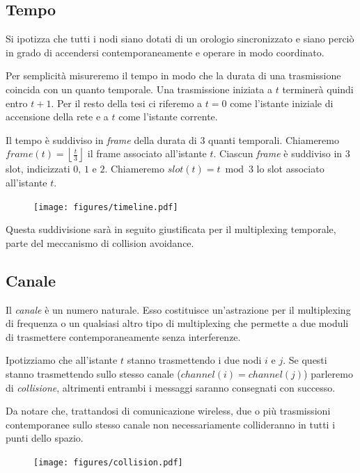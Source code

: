 \documentclass[a4paper,12pt]{article}
\theoremstyle{definition}
\begin{document}
\subsection{Tempo}

Si ipotizza che tutti i nodi siano dotati di un orologio sincronizzato e siano perciò in grado di accendersi contemporaneamente e operare in modo coordinato.

Per semplicità misureremo il tempo in modo che la durata di una trasmissione coincida con un quanto temporale. Una trasmissione iniziata a $t$ terminerà quindi entro $t+1$. Per il resto della tesi ci riferemo a $t=0$ come l'istante iniziale di accensione della rete e a $t$ come l'istante corrente.

Il tempo è suddiviso in \emph{frame} della durata di 3 quanti temporali. Chiameremo $frame(t) =  \left\lfloor\frac{t}{3}\right\rfloor$ il frame associato all'istante $t$. Ciascun \emph{frame} è suddiviso in 3 slot, indicizzati $0,\,1 \text{ e } 2$. Chiameremo $slot(t) = t \bmod 3$ lo slot associato all'istante $t$.

\begin{figure}[H]
\centering
\texttt{[image: figures/timeline.pdf]}
\caption{}
\end{figure}

Questa suddivisione sarà in seguito giustificata per il multiplexing temporale, parte del meccanismo di collision avoidance.

\subsection{Canale}

Il \emph{canale} è un numero naturale. Esso costituisce un'astrazione per il multiplexing di frequenza o un qualsiasi altro tipo di multiplexing che permette a due moduli di trasmettere contemporaneamente senza interferenze.

Ipotizziamo che all'istante $t$ stanno trasmettendo i due nodi $i$ e $j$. Se questi stanno trasmettendo sullo stesso canale ($channel(i) = channel(j)$) parleremo di \emph{collisione}, altrimenti entrambi i messaggi saranno consegnati con successo.

Da notare che, trattandosi di comunicazione wireless, due o più trasmissioni contemporanee sullo stesso canale non necessariamente collideranno in tutti i punti dello spazio.

\begin{figure}[H]
\centering
\texttt{[image: figures/collision.pdf]}
\caption{}
\end{figure}
\end{document}
